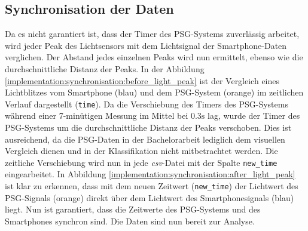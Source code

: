 \subsection{Synchronisation der Daten}
\label{ch:Implementierung:data_sync}
Da es nicht garantiert ist, dass der Timer des PSG-Systems zuverlässig arbeitet, wird jeder Peak des Lichtsensors mit dem Lichtsignal der Smartphone-Daten verglichen.
Der Abstand jedes einzelnen Peaks wird nun ermittelt, ebenso wie die durchschnittliche Distanz der Peaks.
In der Abbildung \ref{implementation:synchronisation:before_light_peak} ist der Vergleich eines Lichtblitzes vom Smartphone (blau) und dem PSG-System (orange) im zeitlichen Verlauf dargestellt (\texttt{time}).
Da die Verschiebung des Timers des PSG-Systems während einer 7-minütigen Messung im Mittel bei $0.3\si{\s}$ lag, wurde der Timer des PSG-Systems um die durchschnittliche Distanz der Peaks verschoben.
Dies ist ausreichend, da die PSG-Daten in der Bachelorarbeit lediglich dem visuellen Vergleich dienen und in der Klassifikation nicht mitbetrachtet werden. 
Die zeitliche Verschiebung wird nun in jede \textit{csv}-Datei mit der Spalte \texttt{new\_time} eingearbeitet.
In Abbildung \ref{implementation:synchronisation:after_light_peak} ist klar zu erkennen, dass mit dem neuen Zeitwert (\texttt{new\_time}) der Lichtwert des PSG-Signals (orange) direkt über dem Lichtwert des Smartphonesignals (blau) liegt.
Nun ist garantiert, dass die Zeitwerte des PSG-Systems und des Smartphones synchron sind. Die Daten sind nun bereit zur Analyse.

